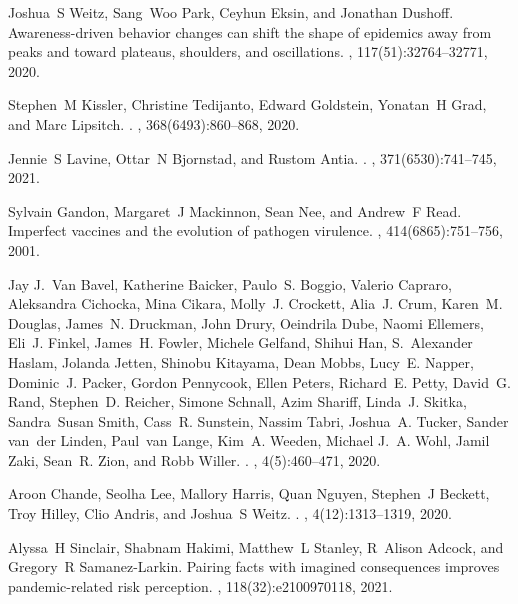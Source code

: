 \documentclass[12pt]{article}
\begin{document}
\begin{thebibliography}{10}
Joshua~S Weitz, Sang~Woo Park, Ceyhun Eksin, and Jonathan Dushoff.
\newblock Awareness-driven behavior changes can shift the shape of epidemics
  away from peaks and toward plateaus, shoulders, and oscillations.
,
  117(51):32764--32771, 2020.

Stephen~M Kissler, Christine Tedijanto, Edward Goldstein, Yonatan~H Grad, and
  Marc Lipsitch.
.
, 368(6493):860--868, 2020.

Jennie~S Lavine, Ottar~N Bjornstad, and Rustom Antia.
.
, 371(6530):741--745, 2021.

Sylvain Gandon, Margaret~J Mackinnon, Sean Nee, and Andrew~F Read.
\newblock Imperfect vaccines and the evolution of pathogen virulence.
, 414(6865):751--756, 2001.

Jay J.~Van Bavel, Katherine Baicker, Paulo~S. Boggio, Valerio Capraro,
  Aleksandra Cichocka, Mina Cikara, Molly~J. Crockett, Alia~J. Crum, Karen~M.
  Douglas, James~N. Druckman, John Drury, Oeindrila Dube, Naomi Ellemers,
  Eli~J. Finkel, James~H. Fowler, Michele Gelfand, Shihui Han, S.~Alexander
  Haslam, Jolanda Jetten, Shinobu Kitayama, Dean Mobbs, Lucy~E. Napper,
  Dominic~J. Packer, Gordon Pennycook, Ellen Peters, Richard~E. Petty, David~G.
  Rand, Stephen~D. Reicher, Simone Schnall, Azim Shariff, Linda~J. Skitka,
  Sandra~Susan Smith, Cass~R. Sunstein, Nassim Tabri, Joshua~A. Tucker, Sander
  van~der Linden, Paul~van Lange, Kim~A. Weeden, Michael J.~A. Wohl, Jamil
  Zaki, Sean~R. Zion, and Robb Willer.
.
, 4(5):460--471, 2020.

Aroon Chande, Seolha Lee, Mallory Harris, Quan Nguyen, Stephen~J Beckett, Troy
  Hilley, Clio Andris, and Joshua~S Weitz.
.
, 4(12):1313--1319, 2020.

Alyssa~H Sinclair, Shabnam Hakimi, Matthew~L Stanley, R~Alison Adcock, and
  Gregory~R Samanez-Larkin.
\newblock Pairing facts with imagined consequences improves pandemic-related
  risk perception.
,
  118(32):e2100970118, 2021.


\end{thebibliography}
\end{document}
